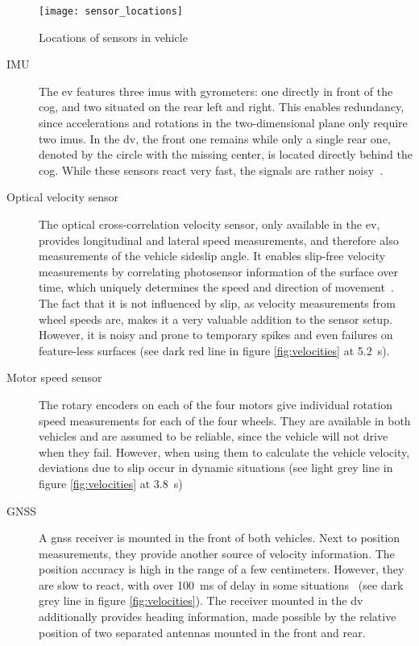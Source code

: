 \begin{figure}[h]
	\centering
	\texttt{[image: sensor\_locations]}%
	\caption{Locations of sensors in vehicle}
	\label{fig:sensor-locations}
\end{figure}

\begin{description}
\item[IMU] The \gls{ev} features three \glspl{imu} with gyrometers: one directly in front of the \gls{cog}, and two situated on the rear left and right. This enables redundancy, since accelerations and rotations in the two-dimensional plane only require two \glspl{imu}. In the \gls{dv}, the front one remains while only a single rear one, denoted by the circle with the missing center, is located directly behind the \gls{cog}. While these sensors react very fast, the signals are rather noisy~\cite[p.~19~ff.]{Biel.2019}.

\item[Optical velocity sensor] The optical cross-correlation velocity sensor, only available in the \gls{ev}, provides longitudinal and lateral speed measurements, and therefore also measurements of the vehicle sideslip angle. It enables slip-free velocity measurements by correlating photosensor information of the surface over time, which uniquely determines the speed and direction of movement~\cite{Bellof.4241993}. The fact that it is not influenced by slip, as velocity measurements from wheel speeds are, makes it a very valuable addition to the sensor setup. However, it is noisy and prone to temporary spikes and even failures on feature-less surfaces (see dark red line in figure \ref{fig:velocities} at \SI{5.2}{\second}).

\item[Motor speed sensor] The rotary encoders on each of the four motors give individual rotation speed measurements for each of the four wheels. They are available in both vehicles and are assumed to be reliable, since the vehicle will not drive when they fail. However, when using them to calculate the vehicle velocity, deviations due to slip occur in dynamic situations (see light grey line in figure \ref{fig:velocities} at \SI{3.8}{\second})

\item[GNSS] A \gls{gnss} receiver is mounted in the front of both vehicles. Next to position measurements, they provide another source of velocity information. The position accuracy is high in the range of a few centimeters. However, they are slow to react, with over \SI{100}{\milli\second} of delay in some situations~\cite[p.~27]{Biel.2019} (see dark grey line in figure \ref{fig:velocities}). The receiver mounted in the \gls{dv} additionally provides heading information, made possible by the relative position of two separated antennas mounted in the front and rear.
\end{description}

